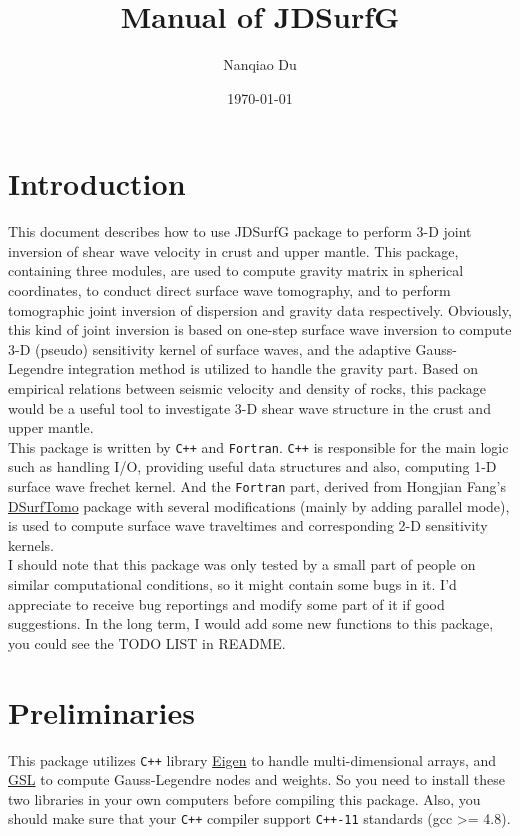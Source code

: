 \documentclass[UTF8]{article}
\title{Manual of JDSurfG}
\author{Nanqiao Du}
\date{\today}
\begin{document}
   \maketitle
   \tableofcontents
   \newpage
   \section{Introduction}
   This document describes how to use JDSurfG package to perform 3-D joint inversion of 
   shear wave velocity in crust and upper mantle. This package, containing three modules, are 
   used to compute gravity matrix in spherical coordinates, to conduct direct surface wave 
   tomography, and to perform tomographic joint inversion of dispersion and gravity data 
   respectively. Obviously, this kind of joint inversion is based on one-step surface wave 
   inversion to compute 3-D (pseudo) sensitivity kernel of surface waves, and the adaptive 
   Gauss-Legendre integration method is utilized to handle the gravity part. Based on 
   empirical relations between seismic velocity and density of rocks, this package would be 
   a useful tool to investigate 3-D shear wave structure in the crust and upper mantle.\\

   This package is written by \verb!C++! and \verb!Fortran!. \verb!C++! is responsible for the main logic such as 
   handling I/O, providing useful data structures and also, computing 1-D surface 
   wave frechet kernel. And the \verb!Fortran! part, derived from Hongjian Fang's 
   \href{https://github.com/HongjianFang/DSurfTomo/tree/stable/src}{DSurfTomo} package 
   with several modifications (mainly by adding parallel mode), 
   is used to compute surface wave traveltimes and corresponding
   2-D sensitivity kernels.\\

   I should note that this package was only tested by a small part of people on similar computational
   conditions, so it might contain some bugs in it. I'd appreciate to receive bug reportings 
   and modify some part of it if good suggestions. In the long term, I would add some new functions 
   to this package, you could see the TODO LIST in README.

   \section{Preliminaries}
   This package utilizes \verb!C++!  library \href{http://eigen.tuxfamily.org/index.php?title=Main_Page}{Eigen}
   to handle multi-dimensional arrays, and \href{http://www.gnu.org/software/gsl/}{GSL} to compute 
   Gauss-Legendre nodes and weights. So you need to install these two libraries in your own 
   computers before compiling this package. Also, you should make sure that your \verb!C++! compiler 
   support \verb!C++-11! standards (gcc >= 4.8).
\end{document}
